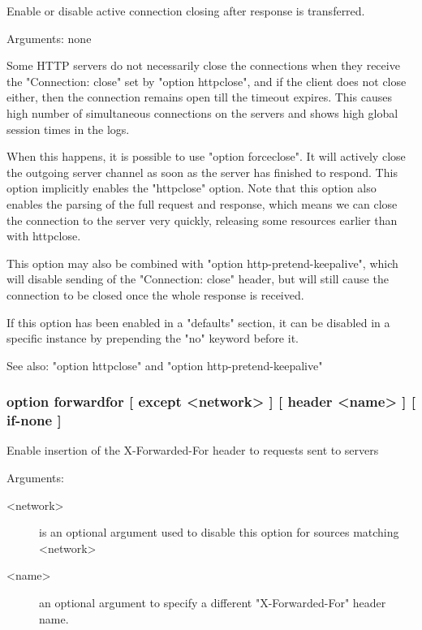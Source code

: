
  Enable or disable active connection closing after response is transferred.


  Arguments: none

  Some HTTP servers do not necessarily close the connections when they receive
  the "Connection: close" set by "option httpclose", and if the client does not
  close either, then the connection remains open till the timeout expires. This
  causes high number of simultaneous connections on the servers and shows high
  global session times in the logs.

  When this happens, it is possible to use "option forceclose". It will
  actively close the outgoing server channel as soon as the server has finished
  to respond. This option implicitly enables the "httpclose" option. Note that
  this option also enables the parsing of the full request and response, which
  means we can close the connection to the server very quickly, releasing some
  resources earlier than with httpclose.

  This option may also be combined with "option http-pretend-keepalive", which
  will disable sending of the "Connection: close" header, but will still cause
  the connection to be closed once the whole response is received.

  If this option has been enabled in a "defaults" section, it can be disabled
  in a specific instance by prepending the "no" keyword before it.

  See also: "option httpclose" and "option http-pretend-keepalive"


\subsubsection[option forwardfor]{option forwardfor [ except <network> ] [ header <name> ] [ if-none ]}


  Enable insertion of the X-Forwarded-For header to requests sent to servers


  Arguments:
\begin{description}
\item[<network>] is an optional argument used to disable this option for sources
              matching <network>
\item[<name>]    an optional argument to specify a different "X-Forwarded-For"
              header name.
\end{description}

